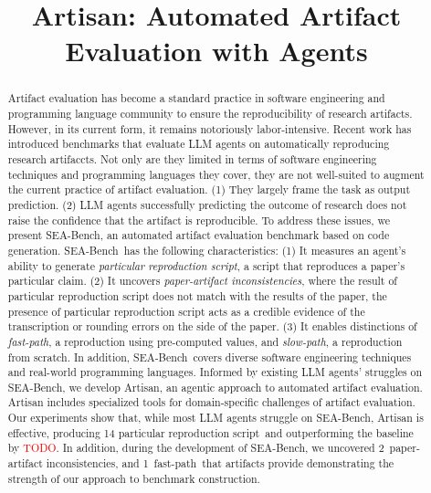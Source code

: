 \documentclass[acmsmall,screen,review,anonymous]{acmart}
\begin{document}
\newcommand\benchmark{SEA-Bench}
\newcommand\approach{Artisan}

\newcommand\particularscrip{particular reproduction script}
\newcommand\newbug{paper-artifact inconsistencies}
\newcommand\fastpath{fast-path}
\newcommand\slowpath{slow-path}

\newcommand\papersetsize{28}
\newcommand\tablesetsize{101}
\newcommand\particularscriptsize{14}
\newcommand\inconsistenciessize{2}
\newcommand\fastpathsize{1}
\newcommand\particularscriptsizeoutperform{\textcolor{red}{TODO}}

\newcommand\todo[1]{\textcolor{red}{TODO: #1}}

\title{Artisan: Automated Artifact Evaluation with Agents}
\begin{abstract}
Artifact evaluation has become a standard practice in software engineering and programming language community to ensure the reproducibility of research artifacts.
However, in its current form, it remains notoriously labor-intensive.
Recent work has introduced benchmarks that evaluate LLM agents on automatically reproducing research artifaccts.
Not only are they limited in terms of software engineering techniques and programming languages they cover, they are not well-suited to augment the current practice of artifact evaluation.
(1) They largely frame the task as output prediction.
(2) LLM agents successfully predicting the outcome of research does not raise the confidence that the artifact is reproducible.
To address these issues, we present \benchmark, an automated artifact evaluation benchmark based on code generation.
\benchmark~has the following characteristics:
(1) It measures an agent’s ability to generate \emph{\particularscrip{}}, a script that reproduces a paper’s particular claim.
(2) It uncovers \emph{\newbug{}}, where the result of \particularscrip{} does not match with the results of the paper, the presence of \particularscrip{} acts as a credible evidence of the transcription or rounding errors on the side of the paper.
(3) It enables distinctions of \emph{\fastpath{}}, a reproduction using pre-computed values, and \emph{\slowpath{}}, a reproduction from scratch.
In addition, \benchmark~covers diverse software engineering techniques and real-world programming languages.
Informed by existing LLM agents’ struggles on \benchmark, we develop Artisan, an agentic approach to automated artifact evaluation.
Artisan includes specialized tools for domain-specific challenges of artifact evaluation.
Our experiments show that, while most LLM agents struggle on \benchmark, Artisan is effective, producing \particularscriptsize{} \particularscrip{}~and outperforming the baseline by \particularscriptsizeoutperform{}.
In addition, during the development of \benchmark, we uncovered \inconsistenciessize~\newbug{}, and \fastpathsize~\fastpath{}~that artifacts provide demonstrating the strength of our approach to benchmark construction.
\end{abstract}
\maketitle










\end{document}
